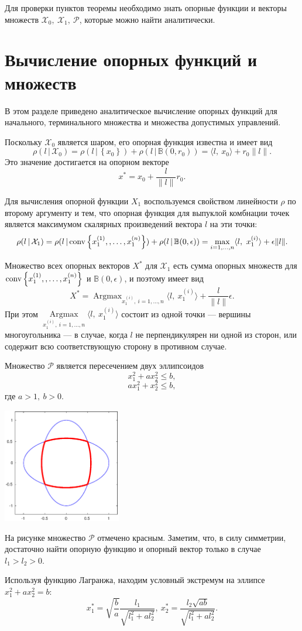 \documentclass[11pt]{article}
\newcommand\PS{\mathcal{P}}
\newcommand\X{\mathcal{X}}
\newcommand\Sup[2]{\rho( #1 \, | \, #2 )}
\newcommand\Conv[1]{{\rm conv}\left\{ #1 \right\}}
\DeclareMathOperator*{\Argmax}{Argmax}
\begin{document}
Для проверки пунктов теоремы необходимо знать опорные функции и векторы множеств $\X_0, \ \X_1, \ \PS$, 
которые можно найти аналитически.

\section{Вычисление опорных функций и множеств}
В этом разделе приведено аналитическое вычисление опорных функций для начального, терминального множества и множества допустимых управлений.

Поскольку $\X_0$ является шаром, его опорная функция известна и имеет вид
$$\Sup{l}{\X_0} = \Sup{l}{\left\{x_0\right\}} + \Sup{l}{\mathbb{B}(0, r_0)} = 
\langle l, \ x_0 \rangle + r_0\|l\|.$$
Это значение достигается на опорном векторе 
$$x^* = x_0 + \frac{l}{\|l\|}r_0.$$

Для вычисления опорной функции $X_1$ воспользуемся свойством линейности $\rho$ по второму аргументу и 
тем, что опорная функция для выпуклой комбнации точек является максимумом скалярных произведений
вектора $l$ на эти точки:
$$\Sup{l}{\X_1} = \Sup{l}{\Conv{x_1^{\left(1\right)},, \ldots, x_1^{\left(n\right)}}} + \Sup{l}{\mathbb{B}(0, \epsilon)} =
\max_{i = 1,\ldots,n} \langle l, \ x_1^{\left(i\right)} \rangle + \epsilon \|l\|.$$

Множество всех опорных векторов $X^*$ для $\X_1$ есть сумма опорных множеств для 
$\Conv{x_1^{\left(1\right)},, \ldots, x_1^{\left(n\right)}}$ и $\mathbb{B}(0, \epsilon)$, и поэтому
имеет вид
$$ X^* = \Argmax_{x_1^{\left(i\right)}, \ i = 1, \ldots, n} \langle l, \ x_1^{\left(i\right)}\rangle + \frac{l}{\|l\|
}\epsilon.$$
При этом $\Argmax\limits_{x_1^{\left(i\right)}, \ i = 1, \ldots, n} \langle l, \ x_1^{\left(i\right)}\rangle$ состоит из одной точки
--- вершины многоугольника --- в случае, когда $l$ не перпендикулярен ни одной из сторон, или 
содержит всю соответствующую сторону в противном случае.

Множество $\PS$ является пересечением двух эллипсоидов \\
$$x_1^2 + a x_2^2 \leq b,$$
$$ax_1^2 + x_2^2 \leq b,$$
где $a > 1, \ b > 0$. \\

\noindent
\parbox[b][5cm][t]{50mm}{\includegraphics[height=50mm]{P_set.eps}}
\hfill
\parbox[b][5cm][t]{90mm}{
На рисунке множество $\PS$ отмечено красным. Заметим, что, в силу симметрии, достаточно найти опорную
функцию и опорный вектор только в случае $l_1 > l_2 > 0$.

Используя функцию Лагранжа, находим условный экстремум на эллипсе $x_1^2 + a x_2^2 = b$:
$$x_1^* = \sqrt{\frac{b}{a}}\frac{l_1}{\sqrt{l_1^2+al_2^2}}, \ x_2^* = \frac{l_2\sqrt{ab}}{\sqrt{l_1^2+al_2^2}}.$$
}
\end{document}
